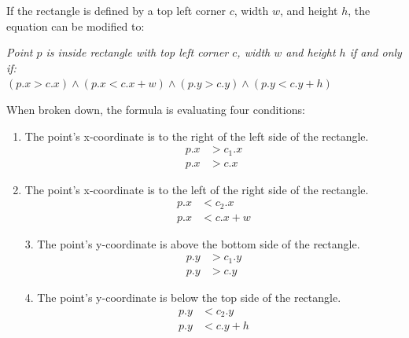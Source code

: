 If the rectangle is defined by a top left corner $c$, width $w$, and height
$h$, the equation can be modified to:

\begin{center}
    \textit{Point $p$ is inside rectangle with top left corner $c$, width $w$ and height $h$ if and only if:} \\
    $(p.x > c.x) \land (p.x < c.x + w) \land (p.y > c.y) \land (p.y < c.y + h)$
\end{center}
When broken down, the formula is evaluating four conditions:
\begin{multicols}{2}
    \begin{enumerate}
        \item The point's x-coordinate is to the right of the left side of the rectangle.
              \begin{equation*}
                  \begin{aligned}
                      p.x & > c_1.x \\
                      p.x & > c.x
                  \end{aligned}
              \end{equation*}

        \item The point's x-coordinate is to the left of the right side of the rectangle.
              \begin{equation*}
                  \begin{aligned}
                      p.x & < c_2.x   \\
                      p.x & < c.x + w
                  \end{aligned}
              \end{equation*}
    \end{enumerate}
\end{multicols}

\begin{multicols}{2}
    \begin{enumerate}
        \item[3.]The point's y-coordinate is above the bottom side of the rectangle.
        \begin{equation*}
            \begin{aligned}
                p.y & > c_1.y \\
                p.y & > c.y
            \end{aligned}
        \end{equation*}

        \item[4.] The point's y-coordinate is below the top side of the rectangle.
            \begin{equation*}
                \begin{aligned}
                    p.y & < c_2.y   \\
                    p.y & < c.y + h
                \end{aligned}
            \end{equation*}
    \end{enumerate}
\end{multicols}

